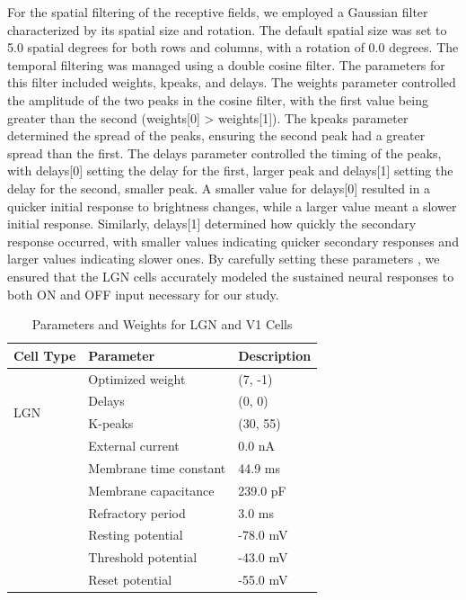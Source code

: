 \documentclass[12pt]{article}
\begin{document}
For the spatial filtering of the receptive fields, we employed a Gaussian filter characterized by its spatial size and rotation. The default spatial size was set to 5.0 spatial degrees for both rows and columns, with a rotation of 0.0 degrees. The temporal filtering was managed using a double cosine filter. The parameters for this filter included weights, kpeaks, and delays. The weights parameter controlled the amplitude of the two peaks in the cosine filter, with the first value being greater than the second (weights[0] > weights[1]). The kpeaks parameter determined the spread of the peaks, ensuring the second peak had a greater spread than the first.
\bigbreak
The delays parameter controlled the timing of the peaks, with delays[0] setting the delay for the first, larger peak and delays[1] setting the delay for the second, smaller peak. A smaller value for delays[0] resulted in a quicker initial response to brightness changes, while a larger value meant a slower initial response. Similarly, delays[1] determined how quickly the secondary response occurred, with smaller values indicating quicker secondary responses and larger values indicating slower ones. By carefully setting these parameters , we ensured that the LGN cells accurately modeled the sustained neural responses to both ON and OFF input necessary for our study.

\begin{table}[H]
  \centering
  \caption{Parameters and Weights for LGN and V1 Cells}
  \begin{tabular}{lll}
  \toprule
  \textbf{Cell Type} & \textbf{Parameter} & \textbf{Description} \\
  \midrule
  \multirow{4}{*}{LGN} 
      & Optimized weight      & (7, -1) \\
      & Delays   & (0, 0) \\
      & K-peaks   & (30, 55) \\
  \midrule
  \multirow{7}{*}{V1} 
      & External current         & 0.0 nA \\
      & Membrane time constant        & 44.9 ms \\
      & Membrane capacitance          & 239.0 pF \\
      & Refractory period       & 3.0 ms \\
      & Resting potential          & -78.0 mV \\
      & Threshold potential         & -43.0 mV \\
      & Reset potential      & -55.0 mV \\
  \bottomrule
  \end{tabular}
\end{table}
\end{document}
